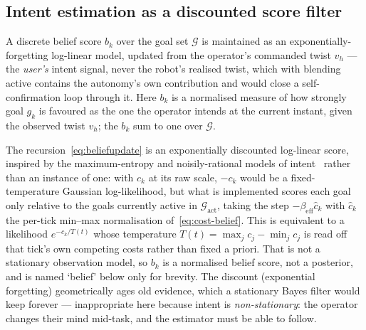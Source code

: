 \subsection{Intent estimation as a discounted score filter}
\label{sec:belief}

A discrete belief score $b_k$ over the goal set $\mathcal{G}$ is maintained as an exponentially-forgetting log-linear model, updated from the operator's commanded twist $v_h$ --- the \emph{user's} intent signal, never the robot's realised twist, which with blending active contains the autonomy's own contribution and would close a self-confirmation loop through it. Here $b_k$ is a normalised measure of how strongly goal $g_k$ is favoured as the one the operator intends at the current instant, given the observed twist $v_h$; the $b_k$ sum to one over $\mathcal{G}$.

The recursion~\eqref{eq:beliefupdate} is an exponentially discounted log-linear score, inspired by the maximum-entropy and noisily-rational models of intent~\cite{ziebart2008maxent,baker2009action,dragan2013policy} rather than an instance of one: with $c_k$ at its raw scale, $-c_k$ would be a fixed-temperature Gaussian log-likelihood, but what is implemented scores each goal only relative to the goals currently active in $\mathcal{G}_{\text{act}}$, taking the step $-\beta_{\text{eff}}\hat{c}_k$ with $\hat{c}_k$ the per-tick min--max normalisation of~\eqref{eq:cost-belief}. This is equivalent to a likelihood $e^{-c_k/T(t)}$ whose temperature $T(t) = \max_j c_j - \min_j c_j$ is read off that tick's own competing costs rather than fixed a priori. That is not a stationary observation model, so $b_k$ is a normalised belief score, not a posterior, and is named `belief' below only for brevity. The discount (exponential forgetting) geometrically ages old evidence, which a stationary Bayes filter would keep forever --- inappropriate here because intent is \emph{non-stationary}: the operator changes their mind mid-task, and the estimator must be able to follow.

